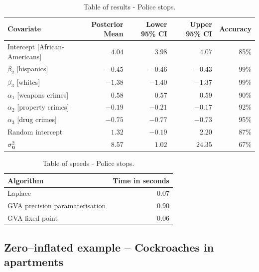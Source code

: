 \begin{table}
	{\footnotesize 
	\begin{tabular}{|l|rrrr|}
		\hline
		Covariate                     & Posterior Mean & Lower 95\% CI & Upper 95\% CI & Accuracy \\
		\hline
		Intercept [African-Americans] & $4.04$          & $3.98$           & $4.07$          & 85\%   \\
		$\beta_2$ [hispanics]         & $-0.45$         & $-0.46$          & $-0.43$         & 99\%   \\
		$\beta_3$ [whites]            & $-1.38$         & $-1.40$          & $-1.37$         & 99\%   \\
		$\alpha_1$ [weapons crimes]   & $0.58$          & $0.57$           & $0.59$          & 90\%   \\
		$\alpha_2$ [property crimes]  & $-0.19$         & $-0.21$          & $-0.17$         & 92\%   \\
		$\alpha_3$ [drug crimes]      & $-0.75$        & $-0.77$          & $-0.73$         & 95\%   \\
		Random intercept              & $1.32$         & $-0.19$         & $2.20$         & 87\%   \\
		$\sigma^2_{{\bf u}}$              & $8.57$          & $1.02$           & $24.35$         & 67\%     \\
		\hline
	\end{tabular}
}\bigskip
	\caption{Table of results - Police stops.}
	\label{tab:application_police_stops}
\end{table}

\begin{table}
	\begin{tabular}{|l|r|}
		\hline
		Algorithm & Time  in seconds \\
		\hline
		Laplace & $0.07$ \\
		GVA precision paramaterisation & $0.90$ \\
		GVA fixed point & $0.06$ \\
		\hline
	\end{tabular}\bigskip
	\caption{Table of speeds - Police stops.}
	\label{tab:police_stop_speeds}
\end{table}

\subsection{Zero--inflated example -- Cockroaches in apartments}
\label{sec:cockroaches}

